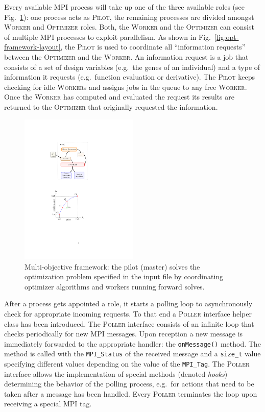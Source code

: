 \documentclass[preprint,linenumbers,amsmath,amssymb,aps,prstab]{revtex4-1}%
\begin{document}
Every available MPI process will take up one of the three available roles (see
  Fig.~\ref{fig:framenetwork}):  one process acts as \textsc{Pilot}, the
  remaining processes are divided amongst \textsc{Worker} and
  \textsc{Optimizer} roles.
Both, the \textsc{Worker} and the \textsc{Optimizer} can consist of multiple
  MPI processes to exploit parallelism.
As shown in Fig.~\ref{fig:opt-framework-layout}, the \textsc{Pilot} is used
  to coordinate all ``information requests'' between the \textsc{Optimizer}
  and the \textsc{Worker}.
An information request is a job that consists of a set of design variables
  (e.g.~the genes of an individual) and a type of information it requests
  (e.g.~function evaluation or derivative).
The \textsc{Pilot} keeps checking for idle \textsc{Worker}s and assigns jobs
  in the queue to any free \textsc{Worker}.
Once the \textsc{Worker} has computed and evaluated the request its results
  are returned to the \textsc{Optimizer} that originally requested the
  information.
%
\begin{figure}%
	\center
	\includegraphics[width=0.5\textwidth]{opt-framework_code}
	\caption{Multi-objective framework: the pilot (master) solves the
		optimization problem specified in the input file by coordinating optimizer
		algorithms and workers running forward solves.}
	\label{fig:framenetwork}
\end{figure}
  

After a process gets appointed a role, it starts a polling loop to asynchronously
  check for appropriate incoming requests.
To that end a \textsc{Poller} interface helper class has been introduced.
The \textsc{Poller} interface consists of an infinite loop that checks
  periodically for new MPI messages.
Upon reception a new message is immediately forwarded to the appropriate
  handler: the \texttt{onMessage()} method.
The method is called with the \texttt{MPI\_Status} of the received message and
  a \texttt{size\_t} value specifying different values depending on the value
  of the \texttt{MPI\_Tag}.
The \textsc{Poller} interface allows the implementation of special methods
  (denoted \textit{hooks}) determining the behavior of the polling process,
  e.g.\ for actions that need to be taken after a message has been handled.
Every \textsc{Poller} terminates the loop upon receiving a special MPI tag.
\end{document}
